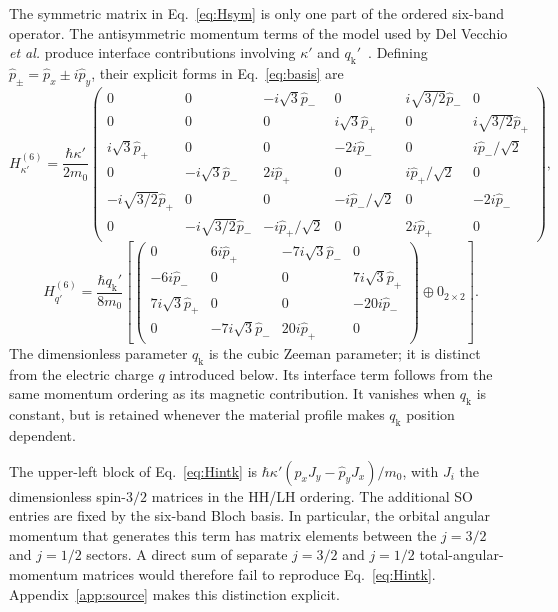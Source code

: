 \documentclass[10pt,letterpaper]{article}
\newcommand{\qq}{q_{\mathrm k}}
\begin{document}
The symmetric matrix in Eq.~\eqref{eq:Hsym} is only one part of the ordered six-band operator. The antisymmetric momentum terms of the model used by Del Vecchio \emph{et al.} produce interface contributions involving $\kappa'$ and $\qq'$~\cite{delvecchio2026}. Defining $ \hat{p}_ \pm= \hat{p}_ x\pm i \hat{p}_ y$, their explicit forms in Eq.~\eqref{eq:basis} are
\begin{equation}
H_{\kappa'}^{(6)}=\frac{\hbar\kappa'}{2m_0}
\begin{pmatrix}
0&0&-i\sqrt3 \hat{p}_ -&0&i\sqrt{3/2} \hat{p}_ -&0\\
0&0&0&i\sqrt3 \hat{p}_ +&0&i\sqrt{3/2} \hat{p}_ +\\
i\sqrt3 \hat{p}_ +&0&0&-2i \hat{p}_ -&0&i \hat{p}_ -/\sqrt2\\
0&-i\sqrt3 \hat{p}_ -&2i \hat{p}_ +&0&i \hat{p}_ +/\sqrt2&0\\
-i\sqrt{3/2} \hat{p}_ +&0&0&-i \hat{p}_ -/\sqrt2&0&-2i \hat{p}_ -\\
0&-i\sqrt{3/2} \hat{p}_ -&-i \hat{p}_ +/\sqrt2&0&2i \hat{p}_ +&0
\end{pmatrix},
\label{eq:Hintk}
\end{equation}
\begin{equation}
H_{q'}^{(6)}=\frac{\hbar\qq'}{8m_0}
\left[
\begin{pmatrix}
0&6i \hat{p}_ +&-7i\sqrt3 \hat{p}_ -&0\\
-6i \hat{p}_ -&0&0&7i\sqrt3 \hat{p}_ +\\
7i\sqrt3 \hat{p}_ +&0&0&-20i \hat{p}_ -\\
0&-7i\sqrt3 \hat{p}_ -&20i \hat{p}_ +&0
\end{pmatrix}\oplus0_{2\times2}
\right].
\label{eq:Hintq}
\end{equation}
The dimensionless parameter $\qq$ is the cubic Zeeman parameter; it is distinct from the electric charge $q$ introduced below. Its interface term follows from the same momentum ordering as its magnetic contribution. It vanishes when $\qq$ is constant, but is retained whenever the material profile makes $\qq$ position dependent.

The upper-left block of Eq.~\eqref{eq:Hintk} is $\hbar\kappa'( \hat{p}_ xJ_y- \hat{p}_ yJ_x)/m_0$, with $J_i$ the dimensionless spin-$3/2$ matrices in the HH/LH ordering. The additional SO entries are fixed by the six-band Bloch basis. In particular, the orbital angular momentum that generates this term has matrix elements between the $j=3/2$ and $j=1/2$ sectors. A direct sum of separate $j=3/2$ and $j=1/2$ total-angular-momentum matrices would therefore fail to reproduce Eq.~\eqref{eq:Hintk}. Appendix~\ref{app:source} makes this distinction explicit.
\end{document}
